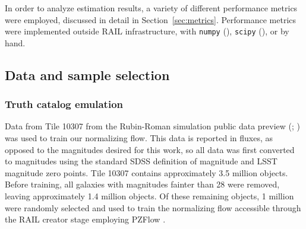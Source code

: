 \documentclass[fleqn,usenatbib,useAMS]{mnras}
\newcommand{\PersonalTag}[3]{{\color{#2}{$^{#1}$ [#3}]}}
\newcommand{\aim}[1]{\PersonalTag{Alex}{violet}{#1}}
\newcommand{\alice}[1]{\PersonalTag{Alice}{olive}{#1}}
\newcommand{\rachel}[1]{\PersonalTag{Rachel}{orange}{#1}}
\newcommand{\cwr}[1]{{\color{black}{#1}}}
\begin{document}
In order to analyze estimation results, a variety of different performance metrics were employed, discussed in detail in Section~\ref{sec:metrics}. Performance metrics were implemented outside RAIL infrastructure, with \texttt{numpy} (\citealt{NumPy}), \texttt{scipy} (\citealt{SciPy}), or by hand. 


\subsection{Data and sample selection}
\label{sec:data}



\subsubsection{Truth catalog emulation}
\label{sec:truthcat}

Data from Tile 10307 from the Rubin-Roman simulation public data preview (\citealt{https://doi.org/10.26131/irsa569}; \citealt{2025MNRAS.544.3799O}) was used to train our normalizing flow. 
This data is reported in fluxes, as opposed to the magnitudes desired for this work, so all data was first converted to magnitudes using the standard SDSS definition of magnitude and LSST magnitude zero points. 
Tile 10307 contains approximately 3.5 million objects. 
Before training, all galaxies with \cwr{true} magnitudes fainter than 28 \cwr{in any band} were removed, leaving approximately 1.4 million objects. 
Of these remaining objects, 1 million were randomly selected and used to train the normalizing flow accessible through the RAIL creator stage employing PZFlow \citep{Crenshaw24}.
\end{document}
